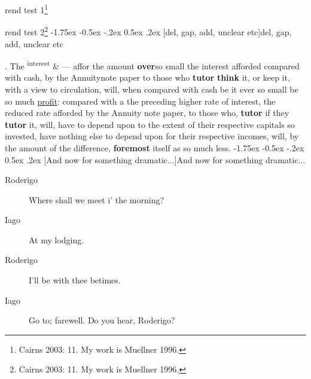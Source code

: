 \documentclass[11pt,twoside]{article}\makeatletter
\makeatletter
\renewcommand\section{\@startsection {section}{1}{\z@}%
     {-1.75ex \@plus -0.5ex \@minus -.2ex}%
     {0.5ex \@plus .2ex}%
     {\reset@font\Large\bfseries\sffamily}}
\renewcommand\subsection{\@startsection{subsection}{2}{\z@}%
     {-1.75ex\@plus -0.5ex \@minus- .2ex}%
     {0.5ex \@plus .2ex}%
     {\reset@font\Large\sffamily}}
\def\DivII{\subsection}
\def\DivII{\section}
\makeatother
\begin{document}
 \par
{rend test 1}\footnote{Cairns 2003: 11. My work is Muellner 1996.}\par
{rend test 2}\footnote{Cairns 2003: 11. My work is Muellner 1996.}
\DivII[del, gap, add, unclear etc]{del, gap, add, unclear etc}\par
. The \textsuperscript{interest} & — affor  	the amount \textbf{over}{\hskip1pt}\newline  so small the interest afforded 	compared with cash,  by the Annuity{\hskip1pt}\newline  note 	paper to those who \textbf{tutor} 	\textbf{think} it, or keep it, with a view {\hskip1pt}\newline  	to circulation, will, when compared with cash 	be it ever so small be {\hskip1pt}\newline  so much \uline{profit}: compared with a 	the preceding higher {\hskip1pt}\newline  rate of interest, the reduced 	rate afforded by the Annuity {\hskip1pt}\newline  note paper, to those who, 	\textbf{tutor} if they \textbf{tutor} it, 	{\hskip1pt}\newline  will, have to depend upon to the extent of their {\hskip1pt}\newline  	respective capitals so invested, have nothing else {\hskip1pt}\newline  to depend upon for 	their respective incomes, will,  	by the {\hskip1pt}\newline  amount of the difference, \textbf{foremost} 	itself as so {\hskip1pt}\newline  much less.
\DivII[And now for something dramatic...]{And now for something dramatic...} \begin{description} \item[Roderigo] 

Where shall we meet i' the morning?\end{description}
 \begin{description} \item[Iago] 

At my lodging.\end{description}
 \begin{description} \item[Roderigo] 

I'll be with thee betimes.\end{description}
 \begin{description} \item[Iago] 

Go to; farewell. Do you hear, Roderigo?\end{description}
\end{document}
